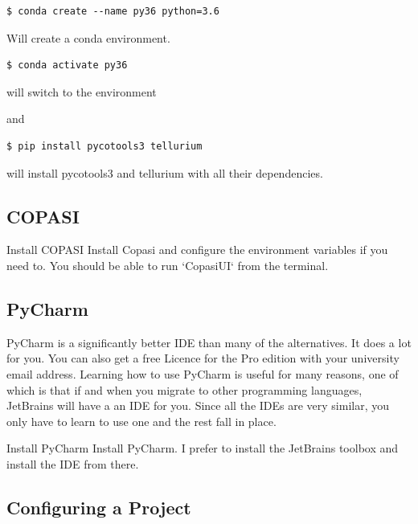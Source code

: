 \documentclass[../main]{subfiles}
\begin{document}
\begin{verbatim}
$ conda create --name py36 python=3.6
\end{verbatim}

Will create a conda environment.

\begin{verbatim}
$ conda activate py36
\end{verbatim}

will switch to the environment

and

\begin{verbatim}
$ pip install pycotools3 tellurium
\end{verbatim}

will install pycotools3 and tellurium with all their dependencies.


\subsection{COPASI}

\begin{Task}{Install COPASI}
Install Copasi and configure the environment variables if you need to. You should be able to
run `CopasiUI` from the terminal.
\end{Task}

\subsection{PyCharm}
PyCharm is a significantly better IDE than many of the alternatives. It does a lot for you. You can also
get a free Licence for the Pro edition with your university email address. Learning how to use
PyCharm is useful for many reasons, one of which is that if and when you migrate to other programming
languages, JetBrains will have a an IDE for you. Since all the IDEs are very similar, you only have
to learn to use one and the rest fall in place.

\begin{Task}{Install PyCharm}
Install PyCharm. I prefer to install the JetBrains toolbox and install the IDE from there.
\end{Task}

\subsection{Configuring a Project}
\end{document}
